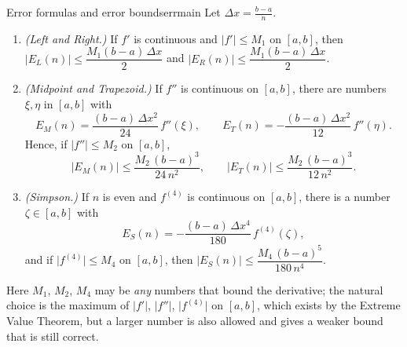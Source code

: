 \documentclass[11pt]{article}
\begin{document}
\begin{thm}{Error formulas and error bounds}{errmain}
Let $\Delta x=\frac{b-a}n$.
\begin{enumerate}[label=(\arabic*),leftmargin=*]
  \item \emph{(Left and Right.)} If $f'$ is continuous and $\lvert f'\rvert\le M_1$ on $[a,b]$, then $\lvert E_L(n)\rvert\le\dfrac{M_1(b-a)\,\Delta x}2$ and $\lvert E_R(n)\rvert\le\dfrac{M_1(b-a)\,\Delta x}2$.
  \item \emph{(Midpoint and Trapezoid.)} If $f''$ is continuous on $[a,b]$, there are numbers $\xi,\eta$ in $[a,b]$ with
  \[E_M(n)=\frac{(b-a)\,\Delta x^2}{24}\,f''(\xi),\qquad E_T(n)=-\frac{(b-a)\,\Delta x^2}{12}\,f''(\eta).\]
  Hence, if $\lvert f''\rvert\le M_2$ on $[a,b]$,
  \[\lvert E_M(n)\rvert\le\frac{M_2\,(b-a)^3}{24\,n^2},\qquad\lvert E_T(n)\rvert\le\frac{M_2\,(b-a)^3}{12\,n^2}.\]
  \item \emph{(Simpson.)} If $n$ is even and $f^{(4)}$ is continuous on $[a,b]$, there is a number $\zeta\in[a,b]$ with
  \[E_S(n)=-\frac{(b-a)\,\Delta x^4}{180}\,f^{(4)}(\zeta),\]
  and if $\lvert f^{(4)}\rvert\le M_4$ on $[a,b]$, then $\lvert E_S(n)\rvert\le\dfrac{M_4\,(b-a)^5}{180\,n^4}$.
\end{enumerate}
Here $M_1$, $M_2$, $M_4$ may be \emph{any} numbers that bound the derivative; the natural choice is the maximum of $\lvert f'\rvert$, $\lvert f''\rvert$, $\lvert f^{(4)}\rvert$ on $[a,b]$, which exists by the Extreme Value Theorem, but a larger number is also allowed and gives a weaker bound that is still correct.
\end{thm}
\end{document}

